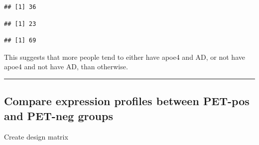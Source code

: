 \documentclass[]{article}
\newenvironment{Shaded}{\begin{snugshade}}{\end{snugshade}}
\newcommand{\KeywordTok}[1]{\textcolor[rgb]{0.13,0.29,0.53}{\textbf{#1}}}
\newcommand{\DataTypeTok}[1]{\textcolor[rgb]{0.13,0.29,0.53}{#1}}
\newcommand{\DecValTok}[1]{\textcolor[rgb]{0.00,0.00,0.81}{#1}}
\newcommand{\StringTok}[1]{\textcolor[rgb]{0.31,0.60,0.02}{#1}}
\newcommand{\OperatorTok}[1]{\textcolor[rgb]{0.81,0.36,0.00}{\textbf{#1}}}
\newcommand{\NormalTok}[1]{#1}
\begin{document}
\begin{verbatim}
## [1] 36
\end{verbatim}

\begin{Shaded}
\end{Shaded}

\begin{verbatim}
## [1] 23
\end{verbatim}

\begin{Shaded}
\end{Shaded}

\begin{verbatim}
## [1] 69
\end{verbatim}

This suggests that more people tend to either have apoe4 and AD, or not
have apoe4 and not have AD, than otherwise.

\begin{center}\rule{0.5\linewidth}{\linethickness}\end{center}

\subsection{Compare expression profiles between PET-pos and PET-neg
groups}\label{compare-expression-profiles-between-pet-pos-and-pet-neg-groups}

Create design matrix

\begin{Shaded}
\end{Shaded}
\end{document}
